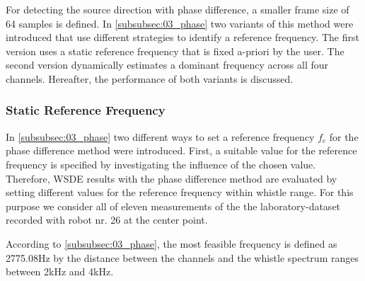 For detecting the source direction with phase difference, a smaller frame
size of 64 samples is defined.
In \cref{subsubsec:03_phase} two variants of this method were introduced that use
different strategies to identify a reference frequency. The first version uses
a static reference frequency that is fixed a-priori by the user. The second version
dynamically estimates a dominant frequency across all four channels. Hereafter,
the performance of both variants is discussed.


\subsubsection*{Static Reference Frequency}

In \cref{subsubsec:03_phase} two different ways to set a reference frequency $f_c$
for the phase difference method were introduced.
First, a suitable value for the reference frequency is specified by
investigating the influence of the chosen value.
Therefore, \ac{WSDE} results with the phase difference method are evaluated by setting
different values for the reference frequency within whistle range.
For this purpose we consider all of eleven measurements of the the laboratory-dataset
recorded with robot nr. 26 at the center point.

According to \cref{subsubsec:03_phase}, the most feasible frequency is defined as
2775.08\si{\hertz} by the distance between the channels
and the whistle spectrum ranges between 2\si{\kilo\hertz}
and 4\si{\kilo\hertz}.

